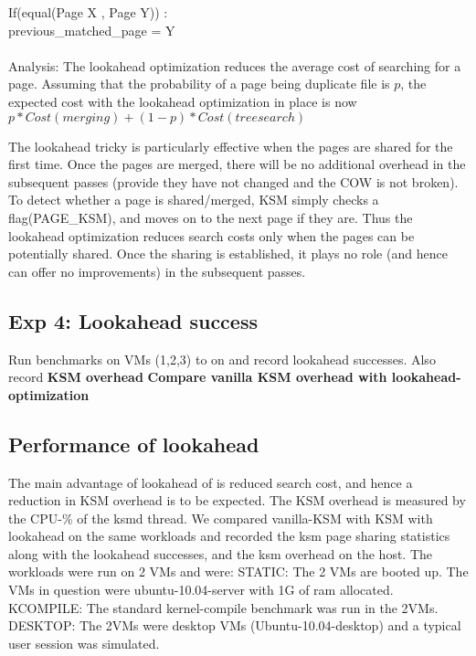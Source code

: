\documentclass[10pt,a4paper]{article}
\begin{document}
If(equal(Page X , Page Y)) : \\
   previous_matched_page = Y \\
\\

Analysis:
The lookahead optimization reduces the average cost of searching for a page. Assuming that the probability of a page being duplicate file is $p$, the expected cost with the lookahead optimization in place is now 
$p*Cost(merging) + (1-p)*Cost(tree search)$

The lookahead tricky is particularly effective when the pages are shared for the first time. Once the pages are merged, there will be no additional overhead in the subsequent passes (provide they have not changed and the COW is not broken). To detect whether a page is shared/merged, KSM simply checks a flag(PAGE\_KSM), and moves on to the next page if they are. 
Thus the lookahead optimization reduces search costs only when the pages can be potentially shared. Once the sharing is established, it plays no role (and hence can offer no improvements) in the subsequent passes. 

\subsection{Exp 4: Lookahead success}

Run benchmarks on VMs (1,2,3) to on and record lookahead successes. Also record \textbf{KSM overhead}
\textbf{Compare vanilla KSM overhead with lookahead-optimization}

\subsection {Performance of lookahead}
The main advantage of lookahead of is reduced search cost, and hence a reduction in KSM overhead is to be expected. The KSM overhead is measured by the CPU-\% of the ksmd thread.
We compared vanilla-KSM with KSM with lookahead on the same workloads and recorded the ksm page sharing statistics along with the lookahead successes, and the ksm overhead on the host.
The workloads were run on 2 VMs and were:
STATIC: The 2 VMs are booted up. The VMs in question were ubuntu-10.04-server with 1G of ram allocated.
KCOMPILE: The standard kernel-compile benchmark was run in the 2VMs. 
DESKTOP: The 2VMs were desktop VMs (Ubuntu-10.04-desktop) and a typical user session was simulated.
\end{document}
